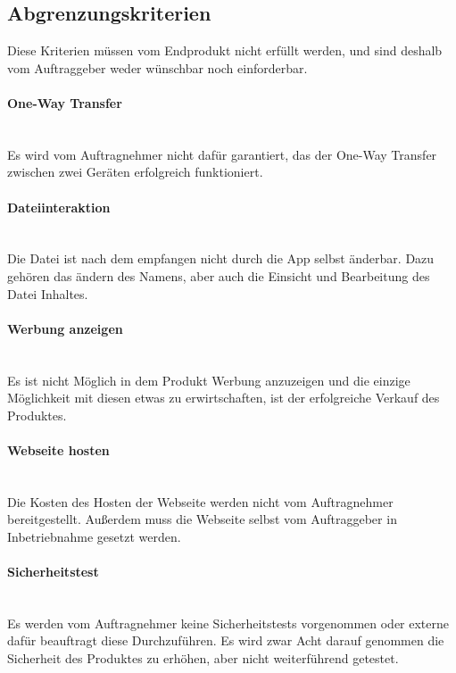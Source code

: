 \subsection{Abgrenzungskriterien}
Diese Kriterien müssen vom Endprodukt nicht erfüllt werden, und sind deshalb vom Auftraggeber weder wünschbar noch einforderbar.
\begin{indentE}\mbox{}
	\paragraph{One-Way Transfer}\mbox{}\\
	Es wird vom Auftragnehmer nicht dafür garantiert, das der One-Way Transfer zwischen zwei Geräten erfolgreich funktioniert.
	\paragraph{Dateiinteraktion}\mbox{}\\
	Die Datei ist nach dem empfangen nicht durch die App selbst änderbar. Dazu gehören das ändern des Namens, aber auch die Einsicht und Bearbeitung des Datei Inhaltes.
	\paragraph{Werbung anzeigen}\mbox{}\\
	Es ist nicht Möglich in dem Produkt Werbung anzuzeigen und die einzige Möglichkeit mit diesen etwas zu erwirtschaften, ist der erfolgreiche Verkauf des Produktes.
	\paragraph{Webseite hosten}\mbox{}\\
	Die Kosten des Hosten der Webseite werden nicht vom Auftragnehmer bereitgestellt. Außerdem muss die Webseite selbst vom Auftraggeber in Inbetriebnahme gesetzt werden.
	\paragraph{Sicherheitstest}\mbox{}\\
	Es werden vom Auftragnehmer keine Sicherheitstests vorgenommen oder externe dafür beauftragt diese Durchzuführen. Es wird zwar Acht darauf genommen die Sicherheit des Produktes zu erhöhen, aber nicht weiterführend getestet.
	\paragraph{}\mbox{}\\
\end{indentE}